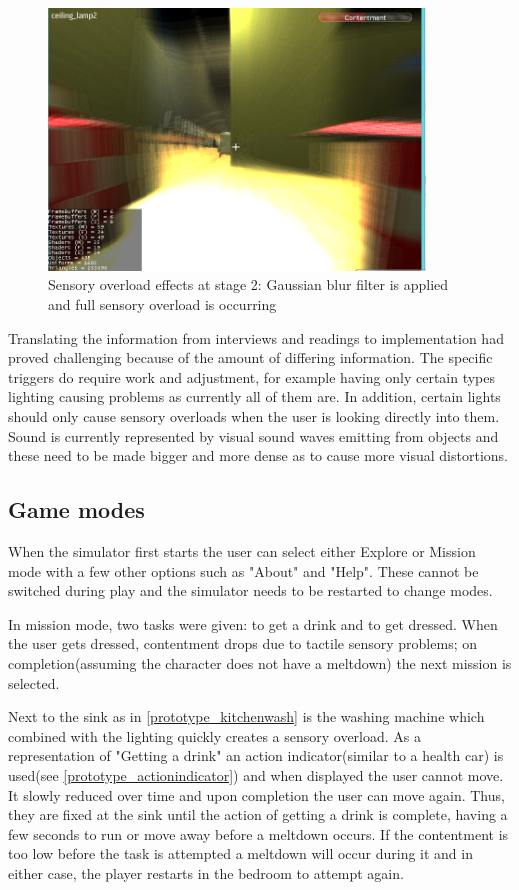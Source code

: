 \documentclass[11pt]{report}
\begin{document}
\begin{figure}[H]
\centering
\includegraphics[width=100mm]{images/prototype/so_kitchen.png}
\caption{Sensory overload effects at stage 2: Gaussian blur filter is applied and full sensory overload is occurring}
\label{prototype_so2s2}
\end{figure}

Translating the information from interviews and readings to implementation had proved challenging because of the amount of differing information. The specific triggers do require work and adjustment, for example having only certain types lighting causing problems as currently all of them are. In addition, certain lights should only cause sensory overloads when the user is looking directly into them. Sound is currently represented by visual sound waves emitting from objects and these need to be made bigger and more dense as to cause more visual distortions.

\subsection*{Game modes}
When the simulator first starts the user can select either Explore or Mission mode with a few other options such as "About" and "Help". These cannot be switched during play and the simulator needs to be restarted to change modes. 

In mission mode, two tasks were given: to get a drink and to get dressed. When the user gets dressed, contentment drops due to tactile sensory problems; on completion(assuming the character does not have a meltdown) the next mission is selected. 

Next to the sink as in \ref{prototype_kitchenwash} is the washing machine which combined with the lighting quickly creates a sensory overload. As a representation of "Getting a drink" an action indicator(similar to a health car) is used(see \ref{prototype_actionindicator}) and when displayed the user cannot move. It slowly reduced over time and upon completion the user can move again. Thus, they are fixed at the sink until the action of getting a drink is complete, having a few seconds to run or move away before a meltdown occurs. If the contentment is too low before the task is attempted a meltdown will occur during it and in either case, the player restarts in the bedroom to attempt again. 
\end{document}
